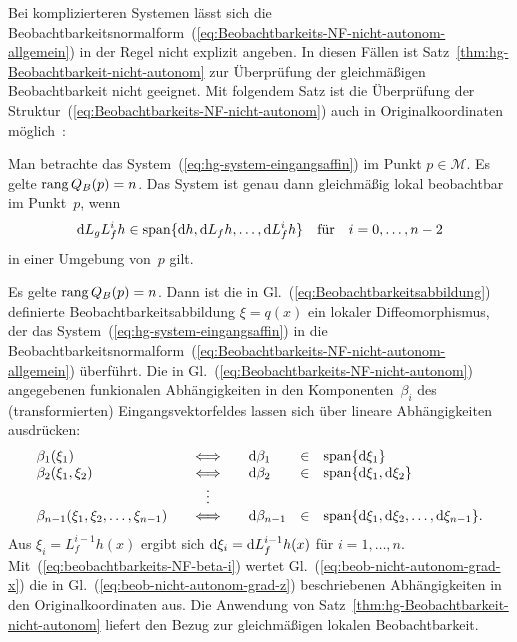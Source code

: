 Bei komplizierteren Systemen lässt sich die Beobachtbarkeitsnormalform~(\ref{eq:Beobachtbarkeits-NF-nicht-autonom-allgemein})
in der Regel nicht explizit angeben. In diesen Fällen ist Satz~\ref{thm:hg-Beobachtbarkeit-nicht-autonom}
zur Überprüfung der gleichmäßigen Beobachtbarkeit nicht geeignet.
Mit folgendem Satz ist die Überprüfung der Struktur~(\ref{eq:Beobachtbarkeits-NF-nicht-autonom})
auch in Originalkoordinaten möglich~\cite[Lemma~2]{jo2002}:
\begin{theorem}
\label{thm:hg-Beobachtbarkeit-nicht-autonom2}Man betrachte das System~(\ref{eq:hg-system-eingangsaffin})
im Punkt $p\in\mathcal{M}$. Es gelte ${\operatorname{rang}}\,Q_{B}(p)=n$. Das System
ist genau dann gleichmäßig lokal beobachtbar im Punkt~$p$, wenn
\begin{equation}
{\mathrm{d}} L_{g}L_{f}^{i}h\in{\operatorname{span}}\{{\mathrm{d}} h,{\mathrm{d}} L_{f}h,\ldots,{\mathrm{d}} L_{f}^{i}h\}\quad\text{für}\quad i=0,\ldots,n-2\label{eq:beob-nicht-autonom-grad-x}
\end{equation}
in einer Umgebung von~$p$ gilt.
\end{theorem}
\begin{svmultproof2}
Es gelte ${\operatorname{rang}}\,Q_{B}(p)=n$. Dann ist die in Gl.~(\ref{eq:Beobachtbarkeitsabbildung})
definierte Beobachtbarkeitsabbildung $\xi=q(x)$ ein lokaler Diffeomorphismus,
der das System~(\ref{eq:hg-system-eingangsaffin}) in die Beobachtbarkeitsnormalform~(\ref{eq:Beobachtbarkeits-NF-nicht-autonom-allgemein})
überführt. Die in Gl.~(\ref{eq:Beobachtbarkeits-NF-nicht-autonom})
angegebenen funkionalen Abhängigkeiten in den Komponenten~$\beta_{i}$
des (transformierten) Eingangsvektorfeldes lassen sich über lineare
Abhängigkeiten ausdrücken:
\begin{equation}
\begin{array}{lclcl}
\beta_{1}(\xi_{1}) & \quad\Longleftrightarrow\quad & {\mathrm{d}}\beta_{1} & \in & {\operatorname{span}}\{{\mathrm{d}}\xi_{1}\}\\
\beta_{2}(\xi_{1},\xi_{2}) & \quad\Longleftrightarrow\quad & {\mathrm{d}}\beta_{2} & \in & {\operatorname{span}}\{{\mathrm{d}}\xi_{1},{\mathrm{d}}\xi_{2}\}\\
 & \vdots\\
\beta_{n-1}(\xi_{1},\xi_{2},\ldots,\xi_{n-1}) & \quad\Longleftrightarrow\quad & {\mathrm{d}}\beta_{n-1} & \in & {\operatorname{span}}\{{\mathrm{d}}\xi_{1},{\mathrm{d}}\xi_{2},\ldots,{\mathrm{d}}\xi_{n-1}\}.
\end{array}\label{eq:beob-nicht-autonom-grad-z}
\end{equation}
Aus $\xi_{i}=L_{f}^{i-1}h(x)$ ergibt sich ${\mathrm{d}}\xi_{i}={\mathrm{d}} L_{f}^{i-1}h(x)$
für $i=1,\ldots,n$. Mit~(\ref{eq:beobachtbarkeits-NF-beta-i}) wertet
Gl.~(\ref{eq:beob-nicht-autonom-grad-x}) die in Gl.~(\ref{eq:beob-nicht-autonom-grad-z})
beschriebenen Abhängigkeiten in den Originalkoordinaten aus. Die Anwendung
von Satz~\ref{thm:hg-Beobachtbarkeit-nicht-autonom} liefert den
Bezug zur gleichmäßigen lokalen Beobachtbarkeit.
\end{svmultproof2}

